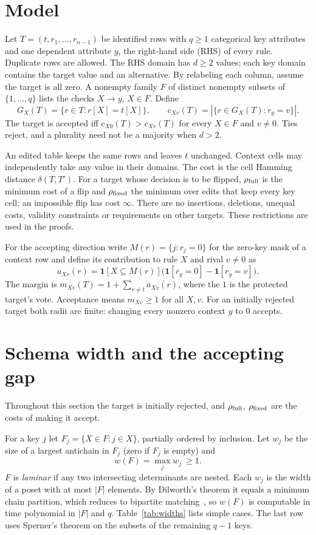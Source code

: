 \documentclass[11pt]{article}
\theoremstyle{remark}
\newcommand{\ind}{\mathbf{1}}
\newcommand{\INF}{\infty}
\newcommand{\rfull}{\rho_{\rm full}}
\newcommand{\rfix}{\rho_{\rm fixed}}
\begin{document}
\section{Model}
Let $T=(t,r_1,\ldots,r_{n-1})$ be identified rows with $q\ge1$ categorical key
attributes and one dependent attribute $y$, the right-hand side (RHS) of every
rule. Duplicate rows are allowed. The RHS domain has $d\ge2$ values; each key domain contains the target value and an
alternative. By relabeling each column, assume the target is all zero. A
nonempty family $F$ of distinct nonempty subsets of $\{1,\ldots,q\}$ lists the
checks $X\to y$, $X\in F$. Define
\[
 G_X(T)=\{r\in T:r[X]=t[X]\},\qquad c_{Xv}(T)=|\{r\in G_X(T):r_y=v\}|.
\]
The target is accepted iff $c_{X0}(T)>c_{Xv}(T)$ for every $X\in F$ and
$v\ne0$. Ties reject, and a plurality need not be a majority when $d>2$.

An edited table keeps the same rows and leaves $t$ unchanged. Context cells may
independently take any value in their domains. The cost is the cell Hamming
distance $\delta(T,T')$. For a target whose decision is to be flipped, $\rfull$ is
the minimum cost of a flip and $\rfix$ the minimum over edits that keep every
key cell; an impossible flip has cost $\INF$. There are no insertions,
deletions, unequal costs, validity constraints or requirements on other
targets. These restrictions are used in the proofs.

For the accepting direction write $M(r)=\{j:r_j=0\}$ for the zero-key mask of a
context row and define its contribution to rule $X$ and rival $v\ne0$ as
\[
 a_{Xv}(r)=\ind[X\subseteq M(r)]\bigl(\ind[r_y=0]-\ind[r_y=v]\bigr).
\]
The margin is $m_{Xv}(T)=1+\sum_{r\ne t}a_{Xv}(r)$, where the $1$ is the
protected target's vote. Acceptance means $m_{Xv}\ge1$ for all $X,v$. For an
initially rejected target both radii are finite: changing every nonzero context
$y$ to $0$ accepts.

\section{Schema width and the accepting gap}\label{sec:width}
Throughout this section the target is initially rejected, and $\rfull$, $\rfix$
are the costs of making it accept.

For a key $j$ let $F_j=\{X\in F:j\in X\}$, partially ordered by inclusion.
Let $w_j$ be the size of a largest antichain in $F_j$ (zero if $F_j$ is
empty) and
\[
 w(F)=\max_j w_j\ \ge 1.
\]
$F$ is \emph{laminar} if any two intersecting determinants are nested. Each
$w_j$ is the width of a poset with at most $|F|$ elements. By Dilworth's theorem
it equals a minimum chain partition, which reduces to bipartite
matching~\cite{fulkerson}, so $w(F)$ is computable in time polynomial in $|F|$
and $q$. Table~\ref{tab:widths} lists simple cases. The last row uses Sperner's theorem
on the subsets of the remaining $q-1$ keys.
\end{document}
